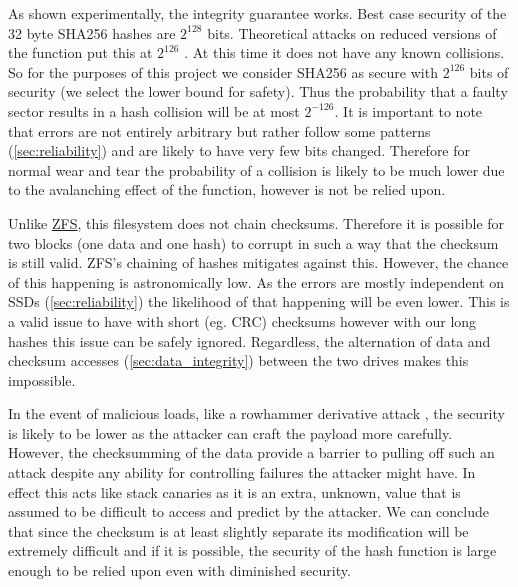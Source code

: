         As shown experimentally, the integrity guarantee works.
        Best case security of the 32 byte SHA256 hashes are $2^{128}$ bits.
        Theoretical attacks on reduced versions of the function put this at
        $2^{126}$ \cite{sha2_security, sha2_analysis}. At this time
        it does not have any known collisions. So for the purposes of this
        project we consider SHA256 as secure with $2^{126}$ bits of security (we
        select the lower bound for safety). Thus the probability that a faulty
        sector results in a hash collision will be at most $2^{-126}$. It is
        important to note that errors are not entirely arbitrary but rather
        follow some patterns (\autoref{sec:reliability}) and are likely to have
        very few bits changed. Therefore for normal wear and tear the
        probability of a collision is likely to be much lower due to the
        avalanching effect of the function, however is not be relied upon.

        Unlike \hyperref[sec:ZFS]{ZFS}, this filesystem does not chain checksums.
        Therefore it is possible for two blocks (one data and one hash) to corrupt
        in such a way that the checksum is still valid. ZFS's chaining of
        hashes mitigates against this. However, the chance of this happening is
        astronomically low. As the errors are mostly independent on SSDs
        (\autoref{sec:reliability}) the likelihood of that happening
        will be even lower. This is a valid issue to have with short (eg. CRC)
        checksums however with our long hashes this issue can be safely
        ignored. Regardless, the alternation of data and checksum accesses
        (\autoref{sec:data_integrity}) between the two drives makes this
        impossible.

        In the event of malicious loads, like a rowhammer derivative attack
        \cite{ssd_rowhammer}, the security is likely to be lower as the
        attacker can craft the payload more carefully. However, the
        checksumming of the data provide a barrier to pulling off such an
        attack despite any ability for controlling failures the attacker might
        have. In effect this acts like stack canaries \cite{canary} as it is
        an extra, unknown, value that is assumed to be difficult to access and
        predict by the attacker. We can conclude that since the checksum is at
        least slightly separate its modification will be extremely difficult
        and if it is possible, the security of the hash function is large enough
        to be relied upon even with diminished security.
